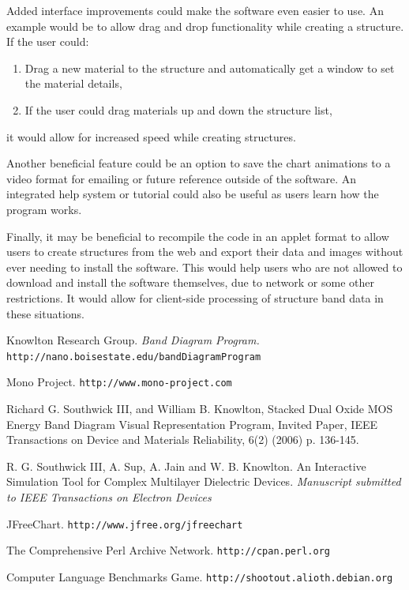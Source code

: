\documentclass[project]{bsu-ms}
\begin{document}
Added interface improvements could make the software even easier to use. An example would be to allow drag and drop functionality while creating a structure. If the user could:

\begin{enumerate}
\item Drag a new material to the structure and automatically get a window to set the material details, 
\item If the user could drag materials up and down the structure list,
\end{enumerate}

it would allow for increased speed while creating structures.

Another beneficial feature could be an option to save the chart animations to a video format for emailing or future reference outside of the software. An integrated help system or tutorial could also be useful as users learn how the program works. 

Finally, it may be beneficial to recompile the code in an applet format to allow users to create structures from the web and export their data and images without ever needing to install the software. This would help users who are not allowed to download and install the software themselves, due to network or some other restrictions. It would allow for client-side processing of structure band data in these situations.



\backmatter

%
%


\begin{thebibliography}{99} 

\label{references}

 Knowlton Research Group. {\em Band Diagram Program.}\\
\texttt{http://nano.boisestate.edu/bandDiagramProgram}

 Mono Project. \texttt{http://www.mono-project.com}

 Richard G. Southwick III, and William B. Knowlton, Stacked Dual Oxide MOS Energy Band Diagram Visual Representation Program, Invited Paper, IEEE Transactions on Device and Materials Reliability, 6(2) (2006) p. 136-145.

 R. G. Southwick III, A. Sup, A. Jain and W. B. Knowlton. An Interactive Simulation Tool for Complex Multilayer Dielectric Devices. {\em Manuscript submitted to IEEE Transactions on Electron Devices}

 JFreeChart. \texttt{http://www.jfree.org/jfreechart}

 The Comprehensive Perl Archive Network. \texttt{http://cpan.perl.org}

 Computer Language Benchmarks Game. \texttt{http://shootout.alioth.debian.org}

\end{thebibliography}

\finish
\end{document}
